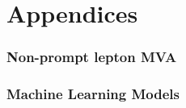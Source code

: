\documentclass[NOTE, atlasdraft=true, texlive=2016, UKenglish]{\ATLASLATEXPATH atlasdoc}
\begin{document}
\clearpage
\printbibliography
%
%

\clearpage
{}


\clearpage
\appendix
\part{Appendices}

\section{Non-prompt lepton MVA}
\label{sec:lepMVA}


\section{Machine Learning Models}
\label{apx:MVA}

\end{document}
